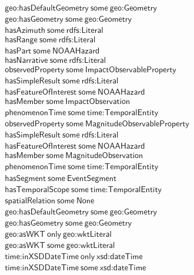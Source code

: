 \begin{align}
  \textsf{geo:hasDefaultGeometry}~\textsf{some}~\textsf{geo:Geometry}\\
  \textsf{geo:hasGeometry}~\textsf{some}~\textsf{geo:Geometry}\\
  \textsf{hasAzimuth}~\textsf{some}~\textsf{rdfs:Literal}\\
  \textsf{hasRange}~\textsf{some}~\textsf{rdfs:Literal}\\
  \textsf{hasPart}~\textsf{some}~\textsf{NOAAHazard}\\
  \textsf{hasNarrative}~\textsf{some}~\textsf{rdfs:Literal}\\
  \textsf{observedProperty}~\textsf{some}~\textsf{ImpactObservableProperty}\\
  \textsf{hasSimpleResult}~\textsf{some}~\textsf{rdfs:Literal}\\
  \textsf{hasFeatureOfInterest}~\textsf{some}~\textsf{NOAAHazard}\\
  \textsf{hasMember}~\textsf{some}~\textsf{ImpactObservation}\\
  \textsf{phenomenonTime}~\textsf{some}~\textsf{time:TemporalEntity}\\
  \textsf{observedProperty}~\textsf{some}~\textsf{MagnitudeObservableProperty}\\
  \textsf{hasSimpleResult}~\textsf{some}~\textsf{rdfs:Literal}\\
  \textsf{hasFeatureOfInterest}~\textsf{some}~\textsf{NOAAHazard}\\
  \textsf{hasMember}~\textsf{some}~\textsf{MagnitudeObservation}\\
  \textsf{phenomenonTime}~\textsf{some}~\textsf{time:TemporalEntity}\\
  \textsf{hasSegment}~\textsf{some}~\textsf{EventSegment}\\
  \textsf{hasTemporalScope}~\textsf{some}~\textsf{time:TemporalEntity}\\
  \textsf{spatialRelation}~\textsf{some}~\textsf{None}\\
  \textsf{geo:hasDefaultGeometry}~\textsf{some}~\textsf{geo:Geometry}\\
  \textsf{geo:hasGeometry}~\textsf{some}~\textsf{geo:Geometry}\\
  \textsf{geo:asWKT}~\textsf{only}~\textsf{geo:wktLiteral}\\
  \textsf{geo:asWKT}~\textsf{some}~\textsf{geo:wktLiteral}\\
  \textsf{time:inXSDDateTime}~\textsf{only}~\textsf{xsd:dateTime}\\
  \textsf{time:inXSDDateTime}~\textsf{some}~\textsf{xsd:dateTime}\end{align}


